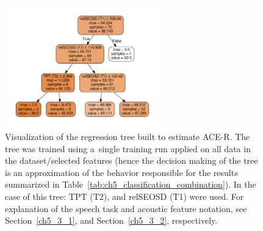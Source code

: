 \begin{figure}[htb!]
	\centering
	\scriptsize
	\includegraphics[width=0.60\textwidth]{pictures/ch5_tree_model_acer.pdf}
	\caption[Regression tree graph visualization for ACE-R]{Visualization of the regression tree built to estimate ACE-R. The tree was trained using a~single training run applied on all data in the dataset/selected features (hence the decision making of the tree is an approximation of the behavior responsible for the results summarized in Table~\ref{tab:ch5_classification_combination}). In the case of this tree: TPT (T2), and relSEOSD (T1) were used. For explanation of the speech task and acoustic feature notation, see Section~\ref{ch5_3_1}, and Section~\ref{ch5_3_2}, respectively.}
	\label{fig:ch5_regression_tree_acer}
\end{figure}

